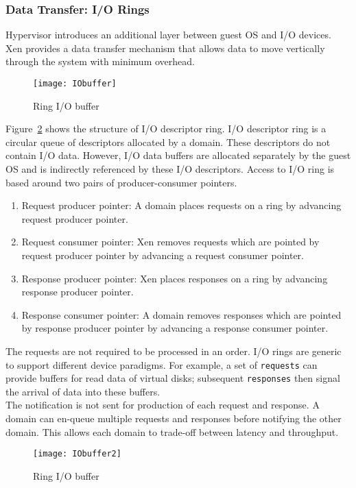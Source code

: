 \subsubsection*{Data Transfer: I/O Rings}
\label{subsec:io rings}
Hypervisor introduces an additional layer between guest OS and I/O devices. Xen provides a data transfer mechanism that allows data to move vertically through the system with minimum overhead. 
\begin{figure}[!ht]
\centering
\texttt{[image: IObuffer]}
\caption{Ring I/O buffer}
\label{fig:Ring buffer}
\end{figure}
Figure~\ref{fig:Ring buffer} shows the structure of I/O descriptor ring. I/O descriptor ring is a circular queue of descriptors allocated by a domain. These descriptors do not contain I/O data. However, I/O data buffers are allocated separately by the guest OS and is indirectly referenced by these I/O descriptors. Access to I/O ring is based around two pairs of producer-consumer pointers.
\begin{enumerate}
\item Request producer pointer: A domain places requests on a ring by advancing request producer pointer. 
\item Request consumer pointer: Xen removes requests which are pointed by request producer pointer by advancing a request consumer pointer. 
\item Response producer pointer: Xen places responses on a ring by advancing response producer pointer. 
\item Response consumer pointer: A domain removes responses which are pointed by response producer pointer by advancing a response consumer pointer. 
\end{enumerate} 
The requests are not required to be processed in an order. I/O rings are generic to support different device paradigms. For example, a set of \texttt{requests} can provide buffers for read data of virtual disks; subsequent \texttt{responses} then signal the arrival of data into these buffers. 
\\[3mm]
The notification is not sent for production of each request and response. A domain can en-queue multiple requests and responses before notifying the other domain. This allows each domain to trade-off between latency and throughput.
\begin{figure}[!ht]
\centering
\texttt{[image: IObuffer2]}
\caption{Ring I/O buffer}
\label{fig:Ring buffer}
\end{figure}
